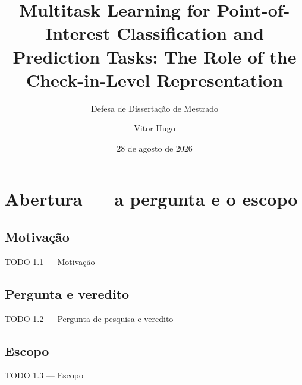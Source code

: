 \documentclass{beamer}
\title[Título curto]{Multitask Learning for Point-of-Interest Classification and Prediction Tasks: The Role of the Check-in-Level Representation}
\subtitle{Defesa de Dissertação de Mestrado}
\author{Vitor Hugo}
\institute[UFV]{Universidade Federal de Viçosa --- PPGCC}
\date{28 de agosto de 2026}
\begin{document}


\section[Introdução]{Abertura --- a pergunta e o escopo}                          %

\subsection{Motivação}
\begin{frame}{TODO 1.1 --- Motivação}
\end{frame}

\subsection{Pergunta e veredito}
\begin{frame}{TODO 1.2 --- Pergunta de pesquisa e veredito}
\end{frame}

\subsection{Escopo}
\begin{frame}{TODO 1.3 --- Escopo}
\end{frame}
\end{document}
